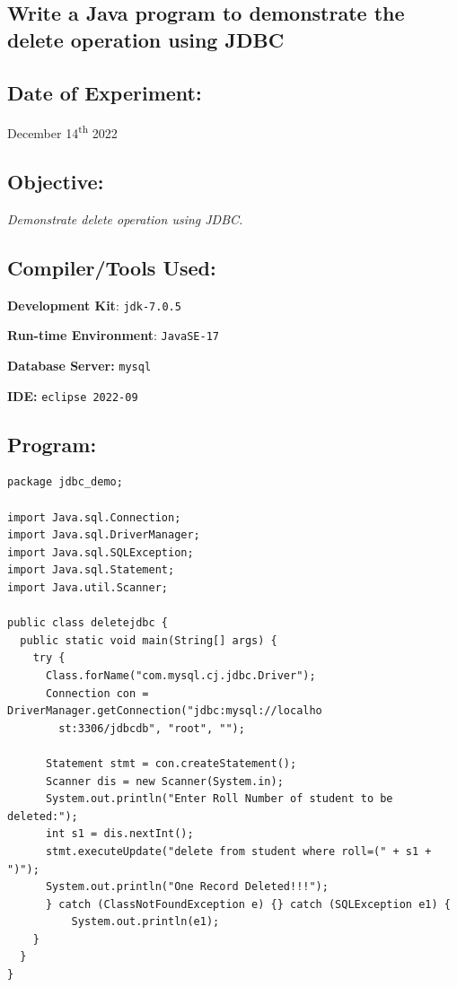 \documentclass[12pt, a4paper]{article}
\begin{document}
\begin{tcolorbox}
  \section{Write a Java program to demonstrate the delete operation using JDBC}
\end{tcolorbox}

\subsection*{Date of Experiment:}
December 14\textsuperscript{th} 2022

\subsection*{Objective:}
\emph{\large{Demonstrate delete operation using JDBC.}}

\subsection*{Compiler/Tools Used:}
\textbf{Development Kit}: \verb+jdk-7.0.5+

\textbf{Run-time Environment}: \verb+JavaSE-17+

\textbf{Database Server:} \verb+mysql+

\textbf{IDE:} \verb+eclipse 2022-09+

\subsection*{Program:}
\begin{lstlisting}
package jdbc_demo;

import Java.sql.Connection;
import Java.sql.DriverManager;
import Java.sql.SQLException;
import Java.sql.Statement;
import Java.util.Scanner;

public class deletejdbc {
  public static void main(String[] args) {
    try {
      Class.forName("com.mysql.cj.jdbc.Driver");
      Connection con = DriverManager.getConnection("jdbc:mysql://localho
        st:3306/jdbcdb", "root", "");

      Statement stmt = con.createStatement();
      Scanner dis = new Scanner(System.in);
      System.out.println("Enter Roll Number of student to be deleted:");
      int s1 = dis.nextInt();
      stmt.executeUpdate("delete from student where roll=(" + s1 + ")");
      System.out.println("One Record Deleted!!!");
      } catch (ClassNotFoundException e) {} catch (SQLException e1) {
          System.out.println(e1);
    }
  }
}
\end{lstlisting}
\end{document}
